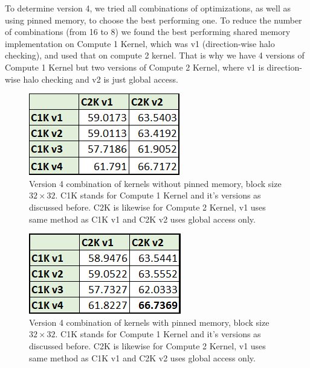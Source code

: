 \documentclass[12pt,reqno]{amsart}
\begin{document}
To determine version 4, we tried all combinations of optimizations, as well as using pinned memory, to choose the best performing one. To reduce the number of combinations (from 16 to 8) we found the best performing shared memory implementation on Compute 1 Kernel, which was v1 (direction-wise halo checking), and used that on compute 2 kernel. That is why we have 4 versions of Compute 1 Kernel but two versions of Compute 2 Kernel, where v1 is direction-wise halo checking and v2 is just global access.

\begin{figure}[h]
\centering
\includegraphics[width=0.45\linewidth]{v4nopin32.png}
\caption{Version 4 combination of kernels without pinned memory, block size $32\times32$. C1K stands for Compute 1 Kernel and it's versions as discussed before. C2K is likewise for Compute 2 Kernel, v1 uses same method as C1K v1 and C2K v2 uses global access only.}
\label{fig:v4nopin}
\end{figure}

\begin{figure}[h]
\centering
\includegraphics[width=0.45\linewidth]{v4yepin32.png}
\caption{Version 4 combination of kernels with pinned memory, block size $32\times32$. C1K stands for Compute 1 Kernel and it's versions as discussed before. C2K is likewise for Compute 2 Kernel, v1 uses same method as C1K v1 and C2K v2 uses global access only.}
\label{fig:v4yepin}
\end{figure}
\end{document}
